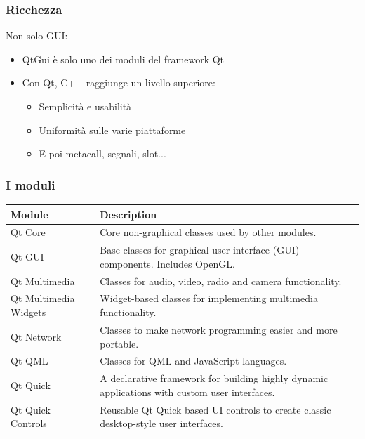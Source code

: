 \documentclass{beamer}
\begin{document}
\begin{frame}
	\frametitle{Ricchezza}
	Non solo GUI:
	\begin{itemize}
		\item QtGui è solo uno dei moduli del framework Qt
		\item Con Qt, C++ raggiunge un livello superiore:
		\begin{itemize}
			\item Semplicità e usabilità
			\item Uniformità sulle varie piattaforme
			\item E poi metacall, segnali, slot...
		\end{itemize}
	\end{itemize}
\end{frame}
\begin{frame}
	\frametitle{I moduli}
	\begin{table}[]
		\centering
		\scriptsize
		\begin{tabular}{lp{8cm}}
			\toprule
			Module                        & Description                                                                                    \\
			\midrule
			Qt Core                       & Core non-graphical classes used by other modules.                                              \\
			Qt GUI                        & Base classes for graphical user interface (GUI) components. Includes OpenGL.                   \\
			Qt Multimedia                 & Classes for audio, video, radio and camera functionality.                                      \\
			Qt Multimedia Widgets         & Widget-based classes for implementing multimedia functionality.                                \\
			Qt Network                    & Classes to make network programming easier and more portable.                                  \\
			Qt QML                        & Classes for QML and JavaScript languages.                                                      \\
			Qt Quick                      & A declarative framework for building highly dynamic applications with custom user interfaces.  \\
			Qt Quick Controls             & Reusable Qt Quick based UI controls to create classic desktop-style user interfaces.           \\

\end{tabular}
\end{table}
\end{frame}
\end{document}
